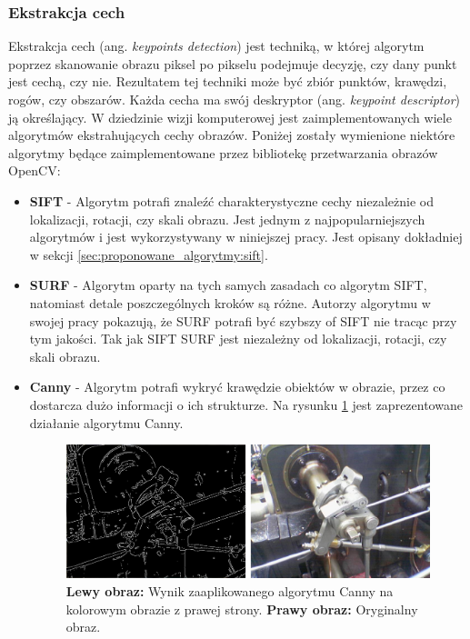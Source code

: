 \subsubsection{Ekstrakcja cech}

Ekstrakcja cech (ang. \textit{keypoints detection}) jest techniką, w której algorytm poprzez skanowanie obrazu piksel po pikselu podejmuje decyzję, czy dany punkt jest cechą, czy nie. Rezultatem tej techniki może być zbiór punktów, krawędzi, rogów, czy obszarów. Każda cecha ma swój deskryptor (ang. \textit{keypoint descriptor}) ją określający. W dziedzinie wizji komputerowej jest zaimplementowanych wiele algorytmów ekstrahujących cechy obrazów. Poniżej zostały wymienione niektóre algorytmy będące zaimplementowane przez bibliotekę przetwarzania obrazów OpenCV:

\begin{itemize}
\item \textbf{SIFT} \cite{Lowe:2004:DIF:993451.996342} - Algorytm potrafi znaleźć charakterystyczne cechy niezależnie od lokalizacji, rotacji, czy skali obrazu. Jest jednym z najpopularniejszych algorytmów i jest wykorzystywany w niniejszej pracy. Jest opisany dokładniej w sekcji \ref{sec:proponowane_algorytmy:sift}.
\item \textbf{SURF} \cite{Bay:2008} - Algorytm oparty na tych samych zasadach co algorytm SIFT, natomiast detale poszczególnych kroków są różne. Autorzy algorytmu w swojej pracy pokazują, że SURF potrafi być szybszy of SIFT nie tracąc przy tym jakości. Tak jak SIFT SURF jest niezależny od lokalizacji, rotacji, czy skali obrazu.
\item \textbf{Canny} \cite{Canny:1986} - Algorytm potrafi wykryć krawędzie obiektów w obrazie, przez co dostarcza dużo informacji o ich strukturze. Na rysunku \ref{fig:algorytmy_korejestracji:canny} jest zaprezentowane działanie algorytmu Canny.

\begin{figure}[H]
  \centering
  \includegraphics[width=\textwidth]{gfx/canny}
  \caption{\textbf{Lewy obraz:} Wynik zaaplikowanego algorytmu Canny na kolorowym obrazie z prawej strony. \textbf{Prawy obraz:} Oryginalny obraz.}
  \label{fig:algorytmy_korejestracji:canny}
\end{figure}

\end{itemize}

